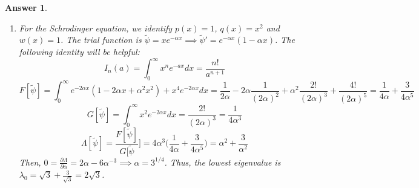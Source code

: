 \documentclass[a4paper]{article}
\newtheorem{ans}{Answer}[section]
\theoremstyle{new}
\begin{document}
\begin{ans}
\begin{enumerate}[label=(\roman*)]
where $\langle\psi_p|\psi_n\rangle=\delta_{p,n}$. And
$$G{\tilde{\psi}}=\sum_{n=0}^\infty|c_n|^2$$
Hence,
$$\Lambda[\tilde{\psi}]=\frac{\sum_{n=0}^\infty\lambda_n|c_n|^2}{\sum_{n=0}^\infty|c_n|^2}=\frac{\lambda_0+\sum_{n=1}^\infty\lambda_n\frac{|c_n|^2}{|c_0|^2}}{1+\sum_{n=1}^\infty\frac{|c_n|^2}{|c_0|^2}}$$
We thus obtained our desired result with $|a_n|^2=\frac{|c_n|^2}{|c_0|^2}$. One can use this obtained result to estimate the lowest eigenvalue by guessing a trial function that obeys the boundary conditions. Afterwhich, we extremize $\Lambda$ with respect to all the parameters it contains.
\item For the Schrodinger equation, we identify $p(x)=1$, $q(x)=x^2$ and $w(x)=1$. The trial function is $\tilde{\psi}=xe^{-\alpha x}\implies\tilde{\psi}'=e^{-\alpha x}(1-\alpha x)$. The following identity will be helpful: $$I_n(a)=\int_0^\infty x^ne^{-ax}dx=\frac{n!}{a^{n+1}}$$
$$F[\tilde{\psi}]=\int_0^\infty e^{-2\alpha x}(1-2\alpha x+\alpha^2x^2)+x^4e^{-2\alpha x}dx=\frac{1}{2\alpha}-2\alpha\frac{1}{(2\alpha)^2}+\alpha^2\frac{2!}{(2\alpha)^3}+\frac{4!}{(2\alpha)^5}=\frac{1}{4\alpha}+\frac{3}{4\alpha^5}$$
$$G[\tilde{\psi}]=\int_0^\infty x^2e^{-2\alpha x}dx=\frac{2!}{(2\alpha)^3}=\frac{1}{4\alpha^3}$$
$$\Lambda[\tilde{\psi}]=\frac{F[\tilde{\psi}]}{G[\tilde{\psi}}]=4\alpha^3\bigg(\frac{1}{4\alpha}+\frac{3}{4\alpha^5}\bigg)=\alpha^2+\frac{3}{\alpha^2}$$
Then, $0=\frac{\partial\Lambda}{\partial\alpha}=2\alpha-6\alpha^{-3}\implies\alpha=3^{1/4}$. Thus, the lowest eigenvalue is $\lambda_0=\sqrt{3}+\frac{3}{\sqrt{3}}=2\sqrt{3}$.
\end{enumerate}
\end{ans}
\newpage
\end{document}
